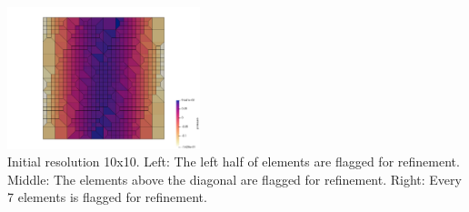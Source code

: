 \begin{center}
\includegraphics[width=5.6cm]{python_codes/fieldstone_102/results/test3/press}\\
{\captionfont Initial resolution 10x10. 
Left: The left half of elements are flagged for refinement.
Middle: The elements above the diagonal are flagged for refinement.
Right: Every 7 elements is flagged for refinement.}
\end{center}

















